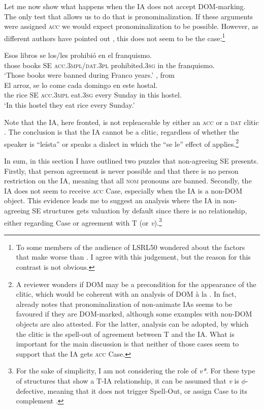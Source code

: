 \documentclass[output=paper,colorlinks,citecolor=brown]{langscibook}
\begin{document}
Let me now show what happens when the IA does not accept DOM-marking. The only test that allows us to do that is pronominalization. If these arguments were assigned \textsc{acc} we would expect pronominalization to be possible. However, as different authors have pointed out \citep{Torrego2008, OrdonezTrevino2016}, this does not seem to be the case:\footnote{To some members of the audience of LSRL50 wondered about the factors that make   worse than . I agree with this judgement, but the reason for this contrast is not obvious.
}

\ea\label{ex:05:*selo} \citet[243]{OrdonezTrevino2016}
    \ea \label{ex:05:*seloa}
        \gll {*} Esos libros se los/les prohibió en el franquismo. \\
        { } those books SE \textsc{acc.3mpl/dat.3pl}  prohibited.\textsc{3sg} in the franquismo. \\
        \glt `Those books were banned during Franco years.'
    \ex \label{ex:05:*selob} \citet[788]{Torrego2008}, from \citet{Ordonez2004} \\
        \gll {*} El arroz, se lo come cada domingo en este hostal. \\
        { } the rice SE \textsc{acc.3mpl} eat.\textsc{3sg} every Sunday in this hostel. \\
        \glt `In this hostel they eat rice every Sunday.'
\z \z

Note that the IA, here fronted, is not repleaceable by either an \textsc{acc} or a \textsc{dat} clitic . The conclusion is that the IA cannot be a clitic, regardless of whether the speaker is ``leísta'' or speaks a dialect in which the ``se le'' effect of  applies.\footnote{A reviewer wonders if DOM may be a precondition for the appearance of the clitic, which would be coherent with an analysis of DOM à la \citet{Lopez2012}. In fact, \citet{Mendikoetxea1999} already notes that pronominalization of non-animate IAs seems to be favoured if they are DOM-marked, although some examples with non-DOM objects are also attested. For the latter,  analysis can be adopted, by which the clitic is the spell-out of agreement between T and the IA. What is important for the main discussion is that neither of those cases seem to support that the IA gets \textsc{acc} Case.}

In sum, in this section I have outlined two puzzles that non-agreeing SE pre\-sents. Firstly, that person agreement is never possible and that there is no person restriction on the IA, meaning that all \textsc{nom} pronouns are banned. Secondly, the IA does not seem to receive \textsc{acc} Case, especially when the IA is a non-DOM object. This evidence leads me to suggest an analysis where the IA in non-agreeing SE structures gets valuation by default since there is no relationship, either regarding Case or agreement with T (or \textit{v}).\footnote{For the sake of simplicity, I am not considering the role of \textit{v*}. For these type of structures that show a T-IA relationship, it can be assumed that \textit{v} is $\phi$-defective, meaning that it does not trigger Spell-Out, or assign Case to its complement \citep{Chomsky2001a}.}
\end{document}
